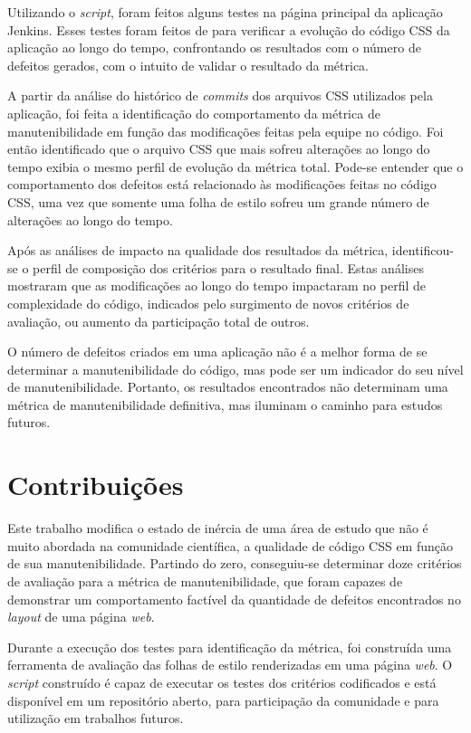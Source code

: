 Utilizando o \textit{script}, foram feitos alguns testes na página principal da aplicação Jenkins. Esses testes foram feitos de para verificar a evolução do código CSS da aplicação ao longo do tempo, confrontando os resultados com o número de defeitos gerados, com o intuito de validar o resultado da métrica.

A partir da análise do histórico de \textit{commits} dos arquivos CSS utilizados pela aplicação, foi feita a identificação do comportamento da métrica de manutenibilidade em função das modificações feitas pela equipe no código. Foi então identificado que o arquivo CSS que mais sofreu alterações ao longo do tempo exibia o mesmo perfil de evolução da métrica total. Pode-se entender que o comportamento dos defeitos está relacionado às modificações feitas no código CSS, uma vez que somente uma folha de estilo sofreu um grande número de alterações ao longo do tempo.

Após as análises de impacto na qualidade dos resultados da métrica, identificou-se o perfil de composição dos critérios para o resultado final. Estas análises mostraram que as modificações ao longo do tempo impactaram no perfil de complexidade do código, indicados pelo surgimento de novos critérios de avaliação, ou aumento da participação total de outros.

O número de defeitos criados em uma aplicação não é a melhor forma de se determinar a manutenibilidade do código, mas pode ser um indicador do seu nível de manutenibilidade. Portanto, os resultados encontrados não determinam uma métrica de manutenibilidade definitiva, mas iluminam o caminho para estudos futuros.

\section{Contribuições}

Este trabalho modifica o estado de inércia de uma área de estudo que não é muito abordada na comunidade científica, a qualidade de código CSS em função de sua manutenibilidade. Partindo do zero, conseguiu-se determinar doze critérios de avaliação para a métrica de manutenibilidade, que foram capazes de demonstrar um comportamento factível da quantidade de defeitos encontrados no \textit{layout} de uma página \textit{web}. 

Durante a execução dos testes para identificação da métrica, foi construída uma ferramenta de avaliação das folhas de estilo renderizadas em uma página \textit{web}. O \textit{script} construído é capaz de executar os testes dos critérios codificados e está disponível em um repositório aberto, para participação da comunidade e para utilização em trabalhos futuros.

